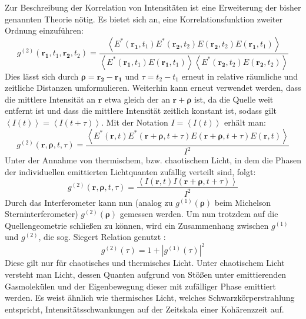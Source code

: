 Zur Beschreibung der Korrelation von Intensitäten ist eine Erweiterung der bisher genannten Theorie nötig. 
Es bietet sich an, eine Korrelationsfunktion zweiter Ordnung einzuführen:
\begin{equation}
    g^{(2)}(\mathbf{r_1}, t_1, \mathbf{r_2}, t_2) = \frac{\left<E^*(\mathbf{r_1}, t_1)E^*(\mathbf{r_2}, t_2)E(\mathbf{r_2}, t_2)E(\mathbf{r_1}, t_1)\right>}{\left<E^*(\mathbf{r_1}, t_1)E(\mathbf{r_1}, t_1)\right> \left<E^*(\mathbf{r_2}, t_2)E(\mathbf{r_2}, t_2)\right> }
\end{equation}
Dies lässt sich durch $\bm{\rho} = \mathbf{r_2} - \mathbf{r_1}$ und $\tau = t_2 - t_1$ erneut in relative räumliche und zeitliche Distanzen umformulieren. Weiterhin kann erneut verwendet werden, dass die mittlere Intensität an $\mathbf{r}$ etwa gleich der an $\mathbf{r} +\bm{\rho}$ ist, da die  Quelle weit entfernt ist und dass die mittlere Intensität zeitlich konstant ist, sodass gilt $\left<I(t)\right> = \left<I(t+\tau)\right>$. Mit der Notation $I=\left<I(t)\right>$ erhält man:
\begin{equation}
    g^{(2)}(\mathbf{r}, \bm{\rho}, t, \tau) = \frac{\left<E^*(\mathbf{r}, t)E^*(\mathbf{r+\rho}, t+\tau)E(\mathbf{r+\rho}, t+\tau)E(\mathbf{r}, t)\right>}{I^2}
\end{equation}
Unter der Annahme von thermischem, bzw. chaotischem Licht, in dem die Phasen der individuellen emittierten Lichtquanten zufällig verteilt sind, folgt:
\begin{equation}
    g^{(2)}(\mathbf{r}, \bm{\rho}, t, \tau) =  \frac{\left<I(\mathbf{r}, t) I(\mathbf{r}+\bm{\rho}, t+\tau)\right>}{I^2}
\end{equation}
Durch das Interferometer kann nun (analog zu $g^{(1)}(\bm{\rho})$ beim Michelson Sterninterferometer) $g^{(2)}(\bm{\rho})$ gemessen werden. 
Um nun trotzdem auf die Quellengeometrie schließen zu können, wird ein Zusammenhang zwischen $g^{(1)}$ und $g^{(2)}$, die sog. Siegert Relation genutzt \cite{lasseguesFieldIntensityCorrelations2022}:
\begin{equation}
    g^{(2)}(\tau) = 1+ \left|g^{(1)}(\tau)\right|^2
\end{equation}
Diese gilt nur für chaotisches und thermisches Licht. 
Unter chaotischem Licht versteht man Licht, dessen Quanten aufgrund von Stößen unter emittierenden Gasmolekülen und der Eigenbewegung dieser mit zufälliger Phase emittiert werden. 
Es weist ähnlich wie thermisches Licht, welches Schwarzkörperstrahlung entspricht, Intensitätsschwankungen auf der  Zeitskala einer Kohärenzzeit auf. 
